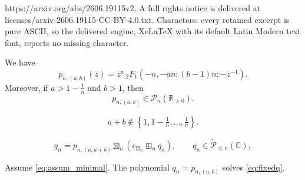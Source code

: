 \documentclass[10pt,a4paper]{amsart}
\newcommand{\C}{\mathbb{C}}
\newcommand{\R}{\mathbb{R}}
\newcommand{\pols}{\mathcal P}
\begin{document}
https://arxiv.org/abs/2606.19115v2. A full rights notice is delivered at licenses/arxiv-2606.19115-CC-BY-4.0.txt. Characters: every retained excerpt is pure ASCII, so the delivered engine, XeLaTeX with its default Latin Modern text font, reports no missing character.
\begin{proposition}\label{thm:hypergeom_zeros}
We have
\[
p_{n,(a,b)}(z)
= z^n\,{}_2F_1\!\left(-n,-an;(b-1)n;-z^{-1}\right).
\]
Moreover, if $a>1-\frac1n$ and $b>1$, then
\[
p_{n,(a,b)} \in \pols_n(\R_{>0}).
\]
\end{proposition}

\begin{align}\label{eq:assum_minimal}
a+b\notin\left\{1,1-\frac1n,\ldots,\frac1n\right\}.
\end{align}

\begin{equation}\label{eq:fixedq}
q_n
=
p_{n,(a,a+b)}\boxtimes_n (e_{\boxtimes_n} \boxplus_n q_n),
\qquad q_n\in\tilde{\pols}_{\le n}(\C),
\end{equation}

\begin{proposition}\label{prop:pff_shift_factorization}
Assume \eqref{eq:assum_minimal}.
The polynomial \(q_n=p_{n,(a,b)}\) solves
\eqref{eq:fixedq}.
\end{proposition}
\end{document}
